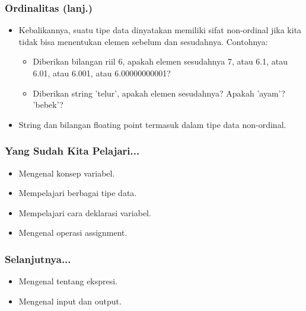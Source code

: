 \documentclass{beamer}
\begin{document}
\begin{frame}
\frametitle{Ordinalitas (lanj.)}
\begin{itemize}
	\item Kebalikannya, suatu tipe data dinyatakan memiliki sifat non-ordinal jika kita tidak bisa menentukan elemen sebelum dan sesudahnya. Contohnya:
	\begin{itemize}
		\item Diberikan bilangan riil 6, apakah elemen sesudahnya 7, atau 6.1, atau 6.01, atau 6.001, atau 6.00000000001?
		\item Diberikan string 'telur', apakah elemen sesudahnya? Apakah 'ayam'? 'bebek'?
	\end{itemize}
	\item String dan bilangan floating point termasuk dalam tipe data non-ordinal.
\end{itemize}
\end{frame}

\begin{frame}
\frametitle{Yang Sudah Kita Pelajari...}
\begin{itemize}
	\item Mengenal konsep variabel.
	\item Mempelajari berbagai tipe data.
	\item Mempelajari cara deklarasi variabel.
	\item Mengenal operasi assignment.
\end{itemize}
\end{frame}

\begin{frame}
\frametitle{Selanjutnya...}
\begin{itemize}
	\item Mengenal tentang ekspresi.
	\item Mengenal input dan output.
\end{itemize}
\end{frame}
\end{document}
